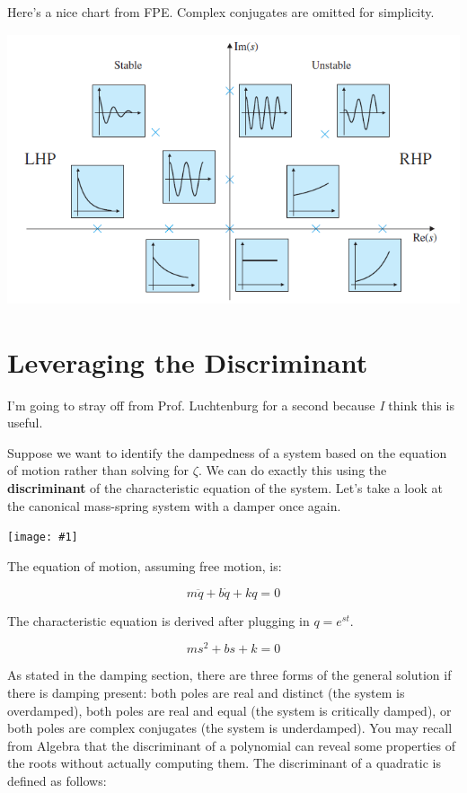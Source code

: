 \documentclass{report}
\newcommand{\bicture}[1]{
\begin{center}
    {\texttt{[image: \#1]}}
\end{center}}
\begin{document}
\begin{onehalfspacing}
\begin{flushleft}
Here's a nice chart from FPE. Complex conjugates are omitted for simplicity.

\begin{center}
    {\includegraphics[height=8cm]{7_fpe}}
\end{center}



\section{Leveraging the Discriminant}

I'm going to stray off from Prof. Luchtenburg for a second because \textit{I} think this is useful.

\medskip

Suppose we want to identify the dampedness of a system based on the equation of motion rather than solving for \(\zeta\). We can do exactly this using the \textbf{discriminant} of the characteristic equation of the system. Let's take a look at the canonical mass-spring system with a damper once again.

\bicture{2_unf}

The equation of motion, assuming free motion, is:

\vspace{-0.1in}
\[m\ddot{q} + b \dot{q} + k q = 0\]

The characteristic equation is derived after plugging in \(q = e^{st}\).

\vspace{-0.1in}
\[ms^2 + bs + k = 0\]

As stated in the damping section, there are three forms of the general solution if there is damping present: both poles are real and distinct (the system is overdamped), both poles are real and equal (the system is critically damped), or both poles are complex conjugates (the system is underdamped). You may recall from Algebra that the discriminant of a polynomial can reveal some properties of the roots without actually computing them. The discriminant of a quadratic is defined as follows:


\end{flushleft}
\end{onehalfspacing}
\end{document}
